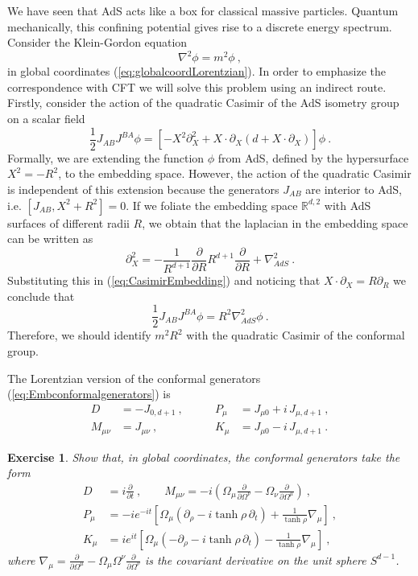\documentclass{ws-rv9x6}
\newtheorem{exercise}{Exercise}[section]
\newcommand\be{\begin{equation}}
\newcommand\ee{\end{equation}}
\begin{document}
We have seen that AdS acts like a box for classical massive particles.
Quantum mechanically, this confining potential gives rise to a discrete
energy spectrum. Consider the Klein-Gordon equation
\be
\nabla^{2}\phi=m^{2}\phi\ ,
\ee
in global coordinates (\ref{eq:globalcoordLorentzian}). In order
to emphasize the correspondence with CFT we will solve this problem
using an indirect route. Firstly, consider the action of the quadratic
Casimir of the AdS isometry group on a scalar field
\begin{equation}
\frac{1}{2}J_{AB}J^{BA}\phi=\left[-X^{2}\partial_{X}^{2}+X\cdot\partial_{X}\left(d+X\cdot\partial_{X}\right)\right]\phi\ .\label{eq:CasimirEmbedding}
\end{equation}
Formally, we are extending the function $\phi$ from AdS, defined
by the hypersurface $X^{2}=-R^{2}$, to the embedding space. However,
the action of the quadratic Casimir is independent of this extension
because the generators $J_{AB}$ are interior to AdS, i.e. $\left[J_{AB},X^{2}+R^{2}\right]=0$.
If we foliate the embedding space $\mathbb{R}^{d,2}$ with AdS surfaces
of different radii $R$, we obtain that the laplacian in the embedding
space can be written as
\be
\partial_{X}^{2}=-\frac{1}{R^{d+1}}\frac{\partial}{\partial R}R^{d+1}\frac{\partial}{\partial R}+\nabla_{AdS}^{2}\ .
\ee
Substituting this in (\ref{eq:CasimirEmbedding}) and noticing that
$X\cdot\partial_{X}=R\partial_{R}$ we conclude that
\begin{equation}
\frac{1}{2}J_{AB}J^{BA}\phi=R^{2}\nabla_{AdS}^{2}\phi\ .\label{eq:CasimirAdS}
\end{equation}
Therefore, we should identify $m^{2}R^{2}$ with the quadratic Casimir
of the conformal group.

The Lorentzian version of the conformal generators (\ref{eq:Embconformalgenerators})
is 
\begin{align}
D&=-J_{0,d+1}\ ,\qquad &P_{\mu}&=J_{\mu0}+i\, J_{\mu,d+1}\ ,\\
 M_{\mu\nu}&=J_{\mu\nu} \ , \qquad &K_{\mu}&=J_{\mu0}-i\, J_{\mu,d+1}\ .
\end{align}
\begin{exercise} 
Show that, in global coordinates, the conformal generators
take the form
\begin{align*}
D&=i\frac{\partial}{\partial t}\ ,\qquad M_{\mu\nu}=-i\left(\Omega_{\mu}\frac{\partial}{\partial\Omega^{\nu}}-\Omega_{\nu}\frac{\partial}{\partial\Omega^{\mu}}\right)\ ,\\
P_{\mu}&=-ie^{-it}\left[\Omega_{\mu}\left(\partial_{\rho}-i\tanh\rho\,\partial_{t}\right)+\frac{1}{\tanh\rho}\nabla_{\mu}\right]\ ,\\
K_{\mu}&=ie^{it}\left[\Omega_{\mu}\left(-\partial_{\rho}-i\tanh\rho\,\partial_{t}\right)-\frac{1}{\tanh\rho}\nabla_{\mu}\right]\ ,
\end{align*}
where $\nabla_{\mu}=\frac{\partial}{\partial\Omega^{\mu}}-\Omega_{\mu}\Omega^{\nu}\frac{\partial}{\partial\Omega^{\nu}}$
is the covariant derivative on the unit sphere $S^{d-1}$. 
\end{exercise}
\end{document}
